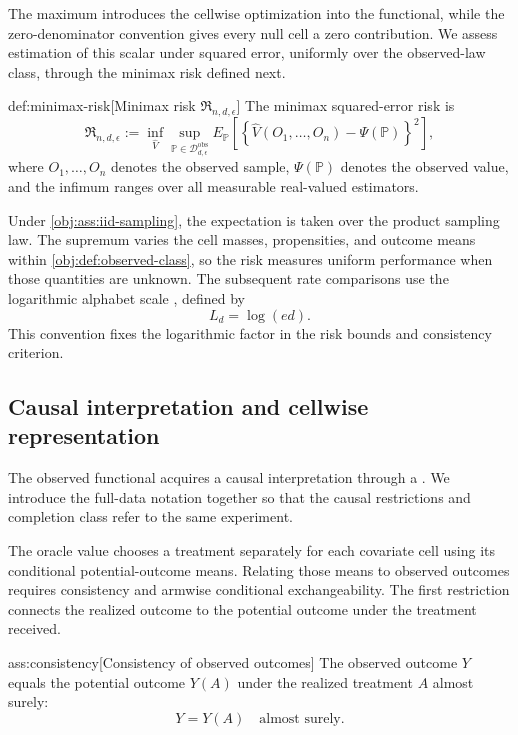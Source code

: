 \documentclass[11pt]{article}
\begin{document}
The maximum introduces the cellwise optimization into the functional, while the zero-denominator convention gives every null cell a zero contribution. We assess estimation of this scalar under squared error, uniformly over the observed-law class, through the minimax risk  defined next.

\begin{definitionv}{def:minimax-risk}[Minimax risk \(\mathfrak R_{n,d,\epsilon}\)]
The minimax squared-error risk is
\[
\mathfrak R_{n,d,\epsilon}
:=
\inf_{\widehat V}
\sup_{\mathbb P\in\mathcal D_{d,\epsilon}^{\mathrm{obs}}}
E_{\mathbb P}
\left[
\left\{
\widehat V(O_1,\ldots,O_n)-\Psi(\mathbb P)
\right\}^{2}
\right],
\]
where \(O_1,\ldots,O_n\) denotes the observed sample, \(\Psi(\mathbb P)\) denotes the observed value, and the infimum ranges over all measurable real-valued estimators.
\end{definitionv}

Under \cref{obj:ass:iid-sampling}, the expectation is taken over the product sampling law. The supremum varies the cell masses, propensities, and outcome means within \cref{obj:def:observed-class}, so the risk measures uniform performance when those quantities are unknown. The subsequent rate comparisons use the logarithmic alphabet scale , defined by
\[
L_d=\log(ed).
\]
This convention fixes the logarithmic factor in the risk bounds and consistency criterion.

\subsection{Causal interpretation and cellwise representation}

The observed functional acquires a causal interpretation through a . We introduce the full-data notation together so that the causal restrictions and completion class refer to the same experiment.



The oracle value chooses a treatment separately for each covariate cell using its conditional potential-outcome means. Relating those means to observed outcomes requires consistency and armwise conditional exchangeability. The first restriction connects the realized outcome to the potential outcome under the treatment received.

\begin{assumptionv}{ass:consistency}[Consistency of observed outcomes]
The observed outcome \(Y\) equals the potential outcome \(Y(A)\) under the realized treatment \(A\) almost surely:
\[
Y=Y(A)\quad\text{almost surely}.
\]
\end{assumptionv}
\end{document}
